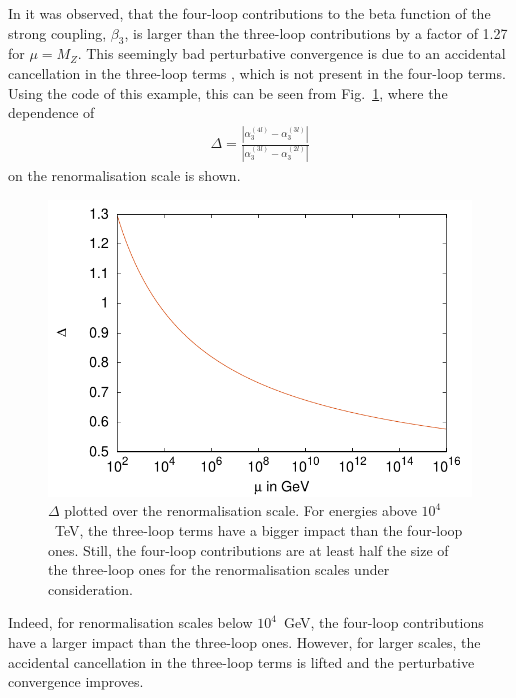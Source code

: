 \documentclass[preprint,12pt]{elsarticle}
\begin{document}
In \cite{Davies:2019onf} it was observed, that the four-loop contributions to the
beta function of the strong coupling, $\beta_3$, is larger than the three-loop contributions by a factor of 1.27 for $\mu = M_Z$. This seemingly bad perturbative convergence
is due to an accidental cancellation in the three-loop terms \cite{Davies:2019onf}, which is not present in the four-loop terms. Using the code of this example, this can be seen from Fig.~\ref{plt::delta}, where the dependence of
\begin{align}
\Delta = \frac{|\alpha_3^{(4l)} - \alpha_3^{(3l)}|}{|\alpha_3^{(3l)} - \alpha_3^{(2l)}|}
\end{align}
on the renormalisation scale is shown.
\begin{figure}
\centering
\includegraphics{delta_running.pdf}
\caption{\label{plt::delta} $\Delta$ plotted over the renormalisation scale. For energies above $10^4$~TeV, the three-loop terms have a bigger impact than the four-loop ones. Still,
the four-loop contributions are at least half the size of the three-loop ones for the renormalisation scales under consideration.}
\end{figure}
Indeed, for renormalisation scales below $10^4$~GeV, the four-loop contributions have a larger impact than the three-loop ones. However, for larger scales,
the accidental cancellation in the three-loop terms is lifted and the perturbative convergence improves.
\end{document}
